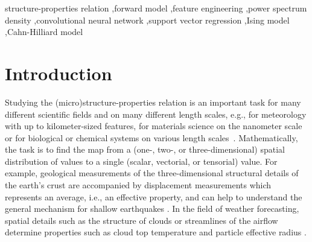 \documentclass[11pt, authoryear]{elsarticle}
\begin{document}
\begin{frontmatter}
		\begin{keyword}
			structure-properties relation \sep forward model \sep feature engineering 
			\sep power spectrum density \sep convolutional neural network \sep support vector regression \sep Ising model \sep Cahn-Hilliard model
		\end{keyword}
	\end{frontmatter}
	
	\clearpage
	\section{Introduction}                                        \label{sec:intro}
	Studying the (micro)structure-properties relation is an important task for
	many different scientific fields and on many different length scales, e.g., 
	for meteorology with up to kilometer-sized features, for materials science
	on the nanometer scale or for biological or chemical systems on various 
	length scales~\citep{Kohn2018}. Mathematically, the task is to find the 
	map  from a (one-, two-, or three-dimensional) spatial distribution of values 
	to a single (scalar, vectorial, or tensorial) value. 
	For example, geological measurements of the three-dimensional structural 
	details of the earth's crust are accompanied by displacement measurements 
	which represents an average, i.e., an effective property, and can help to understand the general mechanism for shallow earthquakes
	\citep{tarasov2019dramatic}.
	In the field of weather forecasting, spatial details such as the 
	structure of clouds or streamlines of the airflow determine properties 
	such as cloud top temperature and particle effective radius \citep{rosenfeld2008satellite}.
\end{document}
